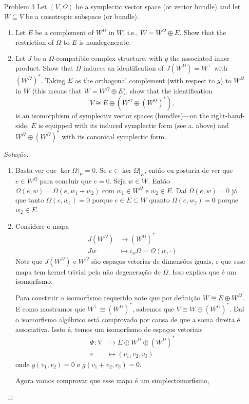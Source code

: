 \begin{idea5}{Problem 3}\leavevmode
Let $(V,\Omega)$ be a symplectic vector space (or vector bundle) and let $W\subseteq V$ be a coisotropic subspace (or bundle).
\begin{enumerate}[label=\alph*.]
	\item Let $E$ be a complement of $W^\Omega$ in $W$, i.e., $W=W^\Omega\oplus E$. Show that the restriction of $\Omega$ to $E$ is nondegenerate.
	\item Let $J$ be a $\Omega$-compatible complex structure, with $g$ the associated inner product. Show that $\Omega$ induces an identification of $J(W^\Omega)=W^\perp$ with $(W^\Omega)^*$. Taking $E$ as the orthogonal complement (with respect to $g$) to $W^\Omega$ in $W$ (this means that $W=W^\Omega\oplus E$), show that the identification
		\[V\cong E\oplus (W^\Omega\oplus (W^\Omega)^*),\]
		is an isomorphism of symplectiv vector spaces (bundles)---on the right-hand-side, $E$ is equipped with its induced symplectic form (see a. above) and $W^\Omega\oplus (W^\Omega)^*$  with its canonical symplectic form.
\end{enumerate}
\end{idea5}

\begin{proof}[Solução]\leavevmode 
\begin{enumerate}[label=\alph*.]
	\item 	Basta ver que $\ker \Omega|_{E}=0$. Se $e\in\ker \Omega|_{E}$, então eu gostaria de ver que $e\in W^\Omega$ para concluir que $e=0$. Seja $w\in W$. Então $\Omega(e,w)=\Omega(e,w_1+w_2)$ com $w_1\in W^\Omega$ e $w_2\in E$. Daí $\Omega(e,w)=0$ já que tanto $\Omega(e,w_1)=0$ porque $e\in E\subset W$ quanto $\Omega(e,w_2)=0$ porque $w_2\in E$.

	\item Considere o mapa
		\begin{align*}
			J(W^\Omega) &\longrightarrow (W^\Omega)^* \\
			Jw &\longmapsto i_w\Omega= \Omega(w,\cdot )
		\end{align*}
		Note que $J(W^\Omega)$ e $W^\Omega$ são espaços vetorias de dimensões iguais, e que esse mapa tem kernel trivial pela não degeneração de $\Omega$. Isso explica que é um isomorfismo.

	Para construir o isomorfismo requerido note que por definição $W\cong E\oplus W^\Omega$. E como mostramos que $W^\perp\cong (W^\Omega)^*$, sabemos que $V\cong W\oplus (W^\Omega)^*$. Daí o isomorfismo algébrico está comprovado por causa de que a soma direita é associativa. Issto é, temos um isomorfismo de espaços vetoriais
	\begin{align*}
		\Phi: V &\longrightarrow E\oplus W^\Omega\oplus (W^\Omega)^* \\
		v &\longmapsto (v_1,v_2,v_3)
	\end{align*}
	onde $g(v_1,v_2)=0$ e $g(v_1+v_2,v_3)=0$.

	Agora vamos comprovar que esse mapa é um simplectomorfismo, 
	
\end{enumerate}
\end{proof}

